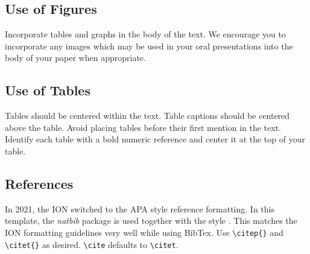 \documentclass[letterpaper,times]{IONconf}
\begin{document}
\subsection{Use of Figures}

Incorporate tables and graphs in the body of the text. We encourage you to incorporate any images which may be used in your oral presentations into the body of your paper when appropriate.


\subsection{Use of Tables}

Tables should be centered within the text. Table captions should be centered above the table. Avoid placing tables before their first mention in the text. Identify each table with a bold numeric reference and center it at the top of your table.



\subsection{References}

In 2021, the ION switched to the APA style reference formatting.
In this template, the \textit{natbib} package is used together with the style \verb||. This matches the ION formatting guidelines very well while using BibTex. Use \verb|\citep{}| and \verb|\citet{}| as desired. \verb|\cite| defaults to \verb|\citet|.
\end{document}
